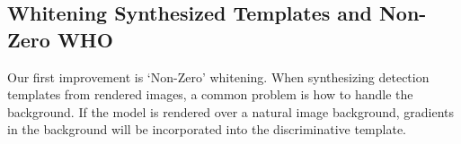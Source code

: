 


% 



\subsection{Whitening Synthesized Templates and Non-Zero WHO}
\label{sec:nzwho}
Our first improvement is `Non-Zero' whitening. When synthesizing detection
templates from rendered images, a common problem is how to handle the
background. If the model is rendered over a natural image background, gradients
in the background will be incorporated into the discriminative template.

